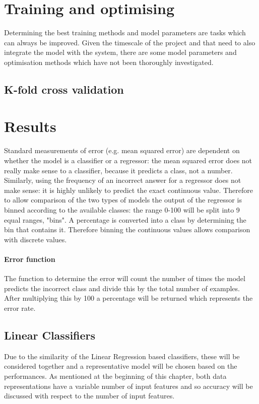 \section{Training and optimising}
Determining the best training methods and model parameters are tasks which can always be improved. Given the timescale of the project and that need to also integrate the model with the system, there are some model parameters and optimisation methods which have not been thoroughly investigated.

\subsection{K-fold cross validation}
\section{Results}
Standard measurements of error (e.g. mean squared error) are dependent on whether the model is a classifier or a regressor: the mean squared error does not really make sense to a classifier, because it predicts a class, not a number. Similarly, using the frequency of an incorrect answer for a regressor does not make sense: it is highly unlikely to predict the exact continuous value. Therefore to allow comparison of the two types of models the output of the regressor is binned according to the available classes: the range 0-100 will be split into 9 equal ranges, "bins". A percentage is converted into a class by determining the bin that contains it. Therefore binning the continuous values allows comparison with discrete values.
\paragraph{Error function}
The function to determine the error will count the number of times the model predicts the incorrect class and divide this by the total number of examples. After multiplying this by 100 a percentage will be returned which represents the error rate.

\subsection{Linear Classifiers}
Due to the similarity of the Linear Regression based classifiers, these will be considered together and a representative model will be chosen based on the performances. As mentioned at the beginning of this chapter, both data representations have a variable number of input features and so accuracy will be discussed with respect to the number of input features.

